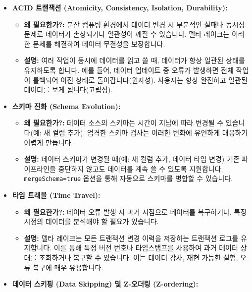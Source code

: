 \documentclass[11pt,a4paper]{article}
\theoremstyle{definition}
\begin{document}
\begin{tcolorbox}[title=\textbf{델타 레이크의 주요 기능}, colback=cyan!5!white, colframe=cyan!75!black, sharp corners, boxrule=0.8pt]
\begin{itemize}
    \item \textbf{ACID 트랜잭션 (Atomicity, Consistency, Isolation, Durability):}
    \begin{itemize}
        \item \textbf{왜 필요한가?:} 분산 컴퓨팅 환경에서 데이터 변경 시 부분적인 실패나 동시성 문제로 데이터가 손상되거나 일관성이 깨질 수 있습니다. 델타 레이크는 이러한 문제를 해결하여 데이터 무결성을 보장합니다.
        \item \textbf{설명:} 여러 작업이 동시에 데이터를 읽고 쓸 때, 데이터가 항상 일관된 상태를 유지하도록 합니다. 예를 들어, 데이터 업데이트 중 오류가 발생하면 전체 작업이 롤백되어 이전 상태로 돌아갑니다(원자성). 사용자는 항상 완전하고 일관된 데이터를 보게 됩니다(고립성).
    \end{itemize}
    \item \textbf{스키마 진화 (Schema Evolution):}
    \begin{itemize}
        \item \textbf{왜 필요한가?:} 데이터 소스의 스키마는 시간이 지남에 따라 변경될 수 있습니다(예: 새 컬럼 추가). 엄격한 스키마 검사는 이러한 변화에 유연하게 대응하기 어렵게 만듭니다.
        \item \textbf{설명:} 데이터 스키마가 변경될 때(예: 새 컬럼 추가, 데이터 타입 변경) 기존 파이프라인을 중단하지 않고도 데이터를 계속 쓸 수 있도록 지원합니다. \texttt{mergeSchema=true} 옵션을 통해 자동으로 스키마를 병합할 수 있습니다.
    \end{itemize}
    \item \textbf{타임 트래블 (Time Travel):}
    \begin{itemize}
        \item \textbf{왜 필요한가?:} 데이터 오류 발생 시 과거 시점으로 데이터를 복구하거나, 특정 시점의 데이터를 분석해야 할 필요가 있습니다.
        \item \textbf{설명:} 델타 레이크는 모든 트랜잭션 변경 이력을 저장하는 트랜잭션 로그를 유지합니다. 이를 통해 특정 버전 번호나 타임스탬프를 사용하여 과거 데이터 상태를 조회하거나 복구할 수 있습니다. 이는 데이터 감사, 재현 가능한 실험, 오류 복구에 매우 유용합니다.
    \end{itemize}
    \item \textbf{데이터 스키핑 (Data Skipping) 및 Z-오더링 (Z-ordering):}
    \begin{itemize}

\end{itemize}
\end{itemize}
\end{tcolorbox}
\end{document}
